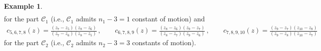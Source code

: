 \documentclass[aps,pre,reprint,longbibliography,superscriptaddress,noshowpacs,floatfix]{revtex4-2}
\theoremstyle{definition}
\newtheorem{example}[theorem]{Example}
\theoremstyle{remark}
\begin{document}
\begin{example}
\begin{align*}
    \end{align*}
    for the part $\mathcal{C}_1$ (i.e., $\mathcal{C}_1$ admits $n_1 -3 = 1$ constant of motion) and
    \begin{align*}
        c_{5,6,7,8}(z) = \frac{(z_{7}-z_{5})(z_{8}-z_{6})}{(z_{7}-z_{6})(z_{8}-z_{5})}\,,\qquad
        c_{6,7,8,9}(z) = \frac{(z_{8}-z_{6})(z_{9}-z_{7})}{(z_{8}-z_{7})(z_{9}-z_{6})}\,,\qquad
        c_{7,8,9,10}(z) = \frac{(z_{9}-z_{7})(z_{10}-z_{8})}{(z_{9}-z_{8})(z_{10}-z_{7})}
    \end{align*}
    for the part $\mathcal{C}_2$ (i.e., $\mathcal{C}_2$ admits $n_2 - 3 = 3$ constants of motion).
    
\end{example}

%
\end{document}
